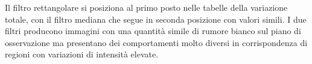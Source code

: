 \documentclass[../main.tex]{subfiles}
\begin{document}
Il filtro rettangolare si posiziona al primo posto nelle tabelle della variazione totale, con il filtro mediana che segue in seconda posizione con valori simili. I due filtri producono immagini con una quantità simile di rumore bianco sul piano di osservazione ma presentano dei comportamenti molto diversi in corrispondenza di regioni con variazioni di intensità elevate.\bigskip

\begin{figure}[ht]
	\centering
	\begin{subfigure}{0.45\linewidth}
		\centering
\end{subfigure}
\end{figure}
\end{document}
